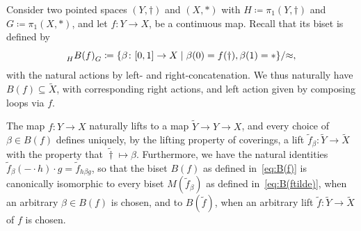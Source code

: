 \documentclass{amsart}
\newcommand\wtf{{\widetilde f}}
\begin{document}
Consider two pointed spaces $(Y,\dagger)$ and $(X,*)$ with
$H\coloneqq\pi_1(Y,\dagger)$ and $G\coloneqq\pi_1(X,*)$, and let
$f\colon Y\to X$, be a continuous map. Recall that its biset is defined by
\begin{equation}\label{eq:B(f)}
  \subscript H{B(f)}_G\coloneqq\{\beta\colon[0,1]\to X\mid\beta(0)=f(\dagger),\beta(1)=*\}/{\approx},
\end{equation}
with the natural actions by left- and right-concatenation. We thus
naturally have $B(f)\subseteq\widetilde X$, with corresponding right
actions, and left action given by composing loops via $f$.

The map $f\colon Y\to X$ naturally lifts to a map
$\widetilde Y\to Y\to X$, and every choice of $\beta\in B(f)$ defines
uniquely, by the lifting property of coverings, a lift
$\wtf_\beta\colon\widetilde Y\to\widetilde X$ with the
property that $\widetilde\dagger\mapsto\beta$. Furthermore, we have
the natural identities
$\wtf_\beta({-}\cdot h)\cdot g=\wtf_{h\beta g}$, so that
the biset $B(f)$ as defined in~\eqref{eq:B(f)} is canonically
isomorphic to every biset $M(\wtf_\beta)$ as defined
in~\eqref{eq:B(ftilde)}, when an arbitrary $\beta\in B(f)$ is chosen,
and to $B(\wtf)$, when an arbitrary lift
$\wtf\colon\widetilde Y\to\widetilde X$ of $f$ is chosen.
\end{document}
